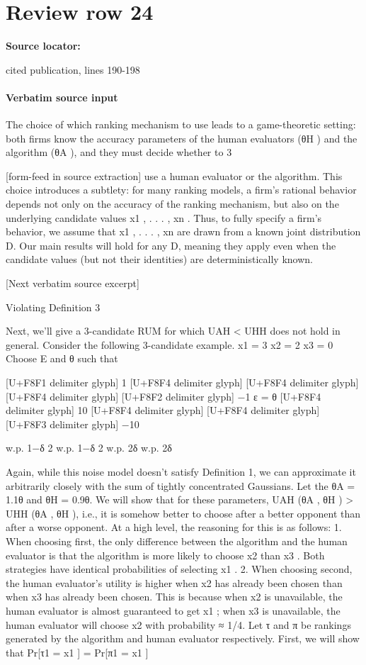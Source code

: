 \documentclass[10pt]{article}
\begin{document}
\section*{Review row 24}
\textbf{Source locator:} {\footnotesize\raggedright cited publication, lines 190-\allowbreak{}198\par}
\paragraph{Verbatim source input}
\begin{ReviewVerbatim}
The choice of which ranking mechanism to use leads to a game-theoretic setting: both firms know the
accuracy parameters of the human evaluators (θH ) and the algorithm (θA ), and they must decide whether to
3


[form-feed in source extraction]
use a human evaluator or the algorithm. This choice introduces a subtlety: for many ranking models, a firm’s
rational behavior depends not only on the accuracy of the ranking mechanism, but also on the underlying
candidate values x1 , . . . , xn . Thus, to fully specify a firm’s behavior, we assume that x1 , . . . , xn are drawn
from a known joint distribution D. Our main results will hold for any D, meaning they apply even when the
candidate values (but not their identities) are deterministically known.

[Next verbatim source excerpt]

Violating Definition 3

Next, we’ll give a 3-candidate RUM for which UAH < UHH does not hold in general. Consider the following
3-candidate example.
x1 = 3
x2 = 2
x3 = 0
Choose E and θ such that

[U+F8F1 delimiter glyph]
1
[U+F8F4 delimiter glyph]
[U+F8F4 delimiter glyph]
[U+F8F4 delimiter glyph]
[U+F8F2 delimiter glyph]
−1
ε
=
θ [U+F8F4 delimiter glyph]
10
[U+F8F4 delimiter glyph]
[U+F8F4 delimiter glyph]
[U+F8F3 delimiter glyph]
−10

w.p. 1−δ
2
w.p. 1−δ
2
w.p. 2δ
w.p. 2δ

Again, while this noise model doesn’t satisfy Definition 1, we can approximate it arbitrarily closely with the
sum of tightly concentrated Gaussians. Let the θA = 1.1θ and θH = 0.9θ.
We will show that for these parameters, UAH (θA , θH ) > UHH (θA , θH ), i.e., it is somehow better to choose
after a better opponent than after a worse opponent. At a high level, the reasoning for this is as follows:
1. When choosing first, the only difference between the algorithm and the human evaluator is that the
algorithm is more likely to choose x2 than x3 . Both strategies have identical probabilities of selecting
x1 .
2. When choosing second, the human evaluator’s utility is higher when x2 has already been chosen than
when x3 has already been chosen. This is because when x2 is unavailable, the human evaluator
is almost guaranteed to get x1 ; when x3 is unavailable, the human evaluator will choose x2 with
probability ≈ 1/4.
Let τ and π be rankings generated by the algorithm and human evaluator respectively. First, we will
show that
Pr[τ1 = x1 ] = Pr[π1 = x1 ]


\end{ReviewVerbatim}
\end{document}
